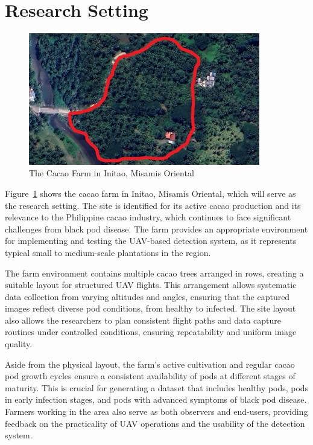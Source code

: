\section{Research Setting}

\begin{figure}[H]
	\centering
	\caption{The Cacao Farm in Initao, Misamis Oriental}
	\label{fig:cacao_farm}
	\includegraphics[width=0.9\textwidth]{figures/Cacao_Farm.pdf}
\end{figure}

Figure~\ref{fig:cacao_farm} shows the cacao farm in Initao, Misamis Oriental, which will serve as the research setting. 
The site is identified for its active cacao production and its relevance to the Philippine cacao industry, which continues to face significant challenges from black pod disease. 
The farm provides an appropriate environment for implementing and testing the UAV-based detection system, as it represents typical small to medium-scale plantations in the region.

The farm environment contains multiple cacao trees arranged in rows, creating a suitable layout for structured UAV flights. 
This arrangement allows systematic data collection from varying altitudes and angles, ensuring that the captured images reflect diverse pod conditions, from healthy to infected. 
The site layout also allows the researchers to plan consistent flight paths and data capture routines under controlled conditions, ensuring repeatability and uniform image quality.

Aside from the physical layout, the farm’s active cultivation and regular cacao pod growth cycles ensure a consistent availability of pods at different stages of maturity. 
This is crucial for generating a dataset that includes healthy pods, pods in early infection stages, and pods with advanced symptoms of black pod disease. 
Farmers working in the area also serve as both observers and end-users, providing feedback on the practicality of UAV operations and the usability of the detection system.

